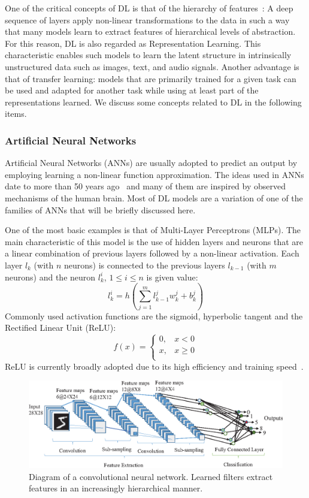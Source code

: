 \documentclass[12pt]{article}
\begin{document}
One of the critical concepts of DL is that of the hierarchy of features~\cite{ref:dl}:
A deep sequence of layers apply non-linear transformations to the data
in such a way that many models learn to extract features of hierarchical
levels of abstraction.
For this reason, DL is also regarded as Representation Learning.
This characteristic enables such models to learn the latent structure
in intrinsically unstructured data such as images, text, and audio signals.
Another advantage is that of transfer learning: models that are
primarily trained for a given task can be used and adapted for another
task while using at least part of the representations learned.
We discuss some concepts related to DL in the following items.

\subsubsection{Artificial Neural Networks}
Artificial Neural Networks (ANNs) are usually adopted to predict
an output by employing learning a non-linear function approximation.
The ideas used in ANNs date to more than 50 years ago~\cite{ref:perceptron} and many of them
are inspired by observed mechanisms of the human brain.
Most of DL models are a variation of one of the families of ANNs
that will be briefly discussed here.

One of the most basic examples is that of Multi-Layer Perceptrons (MLPs).
The main characteristic of this model is the use of hidden layers
and neurons that are a linear combination of previous layers followed by
a non-linear activation.
Each layer $l_k$ (with $n$ neurons) is connected to the previous layers
$l_{k-1}$ (with $m$ neurons) and the neuron $l_k^i$, $1 \le i \le n$
is given value:
$$l_k^i = h\left(\sum_{j=1}^{m} l_{k-1}^jw_k^j + b_k^j\right)$$
Commonly used activation functions are the sigmoid, hyperbolic tangent
and the Rectified Linear Unit (ReLU):
$$f(x) = \begin{cases}
    0, & x < 0 \\
    x, & x \ge 0 \\
        \end{cases}
$$
ReLU is currently broadly adopted due to its high efficiency
and training speed~\cite{ref:relu}.

\begin{figure}[!htb]
\begin{center}
    \includegraphics[width=0.9\linewidth]{./img/cnn2.png}
\caption{
    Diagram of a convolutional neural network.
    Learned filters extract features in an increasingly hierarchical manner.
}
\label{fig:cnn}
\end{center}
\end{figure}
\end{document}
